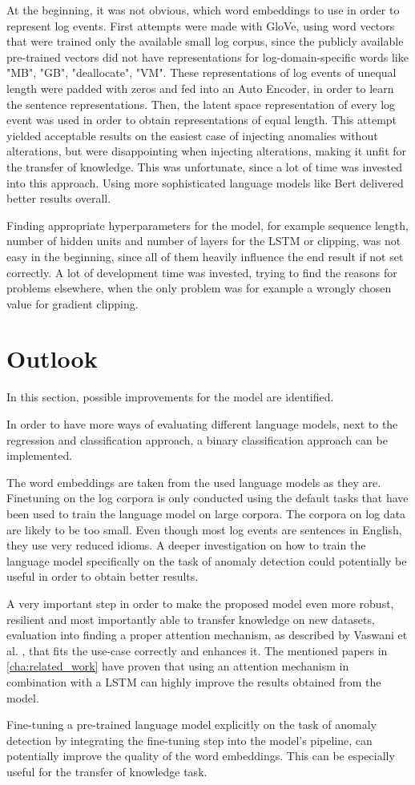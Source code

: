 At the beginning, it was not obvious, which word embeddings to use in order to represent log events. First attempts were made with GloVe, using word vectors that were trained only the available small log corpus, since the publicly available pre-trained vectors did not have representations for log-domain-specific words like "MB", "GB", "deallocate", "VM". These representations of log events of unequal length were padded with zeros and fed into an Auto Encoder, in order to learn the sentence representations. Then, the latent space representation of every log event was used in order to obtain representations of equal length. This attempt yielded acceptable results on the easiest case of injecting anomalies without alterations, but were disappointing when injecting alterations, making it unfit for the transfer of knowledge. This was unfortunate, since a lot of time was invested into this approach. Using more sophisticated language models like Bert delivered better results overall.

Finding appropriate hyperparameters for the model, for example sequence length, number of hidden units and number of layers for the LSTM or clipping, was not easy in the beginning, since all of them heavily influence the end result if not set correctly. A lot of development time was invested, trying to find the reasons for problems elsewhere, when the only problem was for example a wrongly chosen value for gradient clipping.

\section{Outlook\label{sec:outlook}}
In this section, possible improvements for the model are identified. 

In order to have more ways of evaluating different language models, next to the regression and classification approach, a binary classification approach can be implemented.

The word embeddings are taken from the used language models as they are. Finetuning on the log corpora is only conducted using the default tasks that have been used to train the language model on large corpora. The corpora on log data are likely to be too small. Even though most log events are sentences in English, they use very reduced idioms. A deeper investigation on how to train the language model specifically on the task of anomaly detection could potentially be useful in order to obtain better results.

A very important step in order to make the proposed model even more robust, resilient and most importantly able to transfer knowledge on new datasets, evaluation into finding a proper attention mechanism, as described by Vaswani et al. \cite{vaswani2017attention}, that fits the use-case correctly and enhances it. The mentioned papers in \ref{cha:related_work} have proven that using an attention mechanism in combination with a LSTM can highly improve the results obtained from the model.

Fine-tuning a pre-trained language model explicitly on the task of anomaly detection by integrating the fine-tuning step into the model's pipeline, can potentially improve the quality of the word embeddings. This can be especially useful for the transfer of knowledge task.



